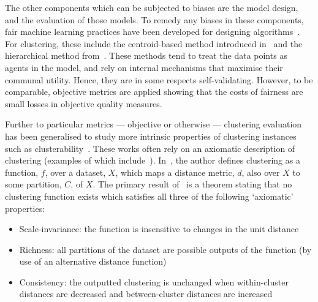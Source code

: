The other components which can be subjected to biases are the model design, and
the evaluation of those models. To remedy any biases in these components, fair
machine learning practices have been developed for designing
algorithms~\cite{CorbettDavies2018,Friedler2016,Goelz2019,Kearns2017}. For
clustering, these include the centroid-based method introduced
in~\cite{Chen2019} and the hierarchical method from~\cite{Ahmadian2020}. These
methods tend to treat the data points as agents in the model, and rely on
internal mechanisms that maximise their communal utility. Hence, they are in
some respects self-validating. However, to be comparable, objective metrics are
applied showing that the costs of fairness are small losses in objective quality
measures.

Further to particular metrics --- objective or otherwise --- clustering
evaluation has been generalised to study more intrinsic properties of clustering
instances such as clusterability~\cite{Ackerman2009,Ostrovsky2006,Zhang2001}.
These works often rely on an axiomatic description of clustering (examples of
which include~\cite{Bezdek1978,Jardine1971,Kleinberg2002}).
In~\cite{Kleinberg2002}, the author defines clustering as a function, \(f\),
over a dataset, \(X\), which maps a distance metric, \(d\), also over \(X\) to
some partition, \(C\), of \(X\).
The primary result of~\cite{Kleinberg2002} is a theorem
stating that no clustering function exists which satisfies all three of the
following `axiomatic' properties:

\begin{itemize}
    \item Scale-invariance: the function is insensitive to changes in the unit
        distance
    \item Richness: all partitions of the dataset are possible outputs of the
        function (by use of an alternative distance function)
    \item Consistency: the outputted clustering is unchanged when within-cluster
        distances are decreased and between-cluster distances are increased
\end{itemize}

